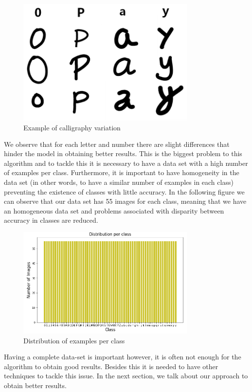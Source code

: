 \documentclass[conference]{IEEEtran}
\begin{document}
\begin{figure}[H]
    \centering
    \includegraphics[width=3.5in]{pictures/4letras.png}
    \caption{Example of calligraphy variation}\label{fig:example4}
\end{figure}

We observe that for each letter and number there are slight differences that hinder the model in obtaining better results. This is the biggest problem to this algorithm and to tackle this it is necessary to have a data set with a high number of examples per class. Furthermore, it is important to have homogeneity in the data set (in other words, to have a similar number of examples in each class) preventing the existence of classes with little accuracy. In the following figure we can observe that our data set has 55 images for each class, meaning that we have an homogeneous data set and problems associated with disparity between accuracy in classes are reduced.
 
\begin{figure}[H]
    \centering
    \includegraphics[width=3.5in]{pictures/DistributionOfEachClass.PNG}
    \caption{Distribution of examples per class}\label{fig:example4}
\end{figure}

Having a complete data-set is important however, it is often not enough for the algorithm to obtain good results. Besides this it is needed to have other techniques to tackle this issue. In the next section, we talk about our approach to obtain better results.
\end{document}
